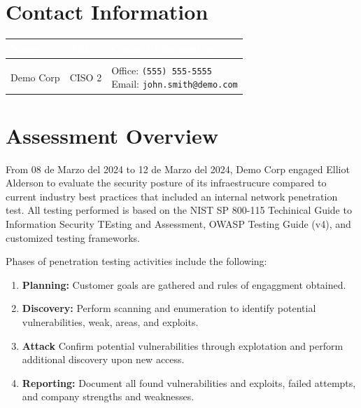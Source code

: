 \documentclass[a4paper]{article} %
\makeatletter
\newcommand{\clientName}{Demo Corp}
\newcommand{\clientTitle}{CISO}
\newcommand{\clientEmail}{john.smith@demo.com}
\newcommand{\clientPhone}{(555) 555-5555}
\newcommand{\theAuthor}{Elliot Alderson}
\newcommand{\theAuthorTitle}{Lead Penetration Tester}
\newcommand{\theAuthorEmail}{elliot.alderson@proton.me}
\newcommand{\startDatePentest}{08 de Marzo del 2024}
\newcommand{\finalDatePentest}{12 de Marzo del 2024}
\makeatother
\begin{document}
    \section{Contact Information} %
    \begin{table}[htbp]
        \begin{tabularx}{\textwidth}{|X|X|p{6cm}|}
            \hline
            \rowcolor{gray}
            \textbf{\textcolor{white}{Name}} & \textbf{\textcolor{white}{Title}} & \textbf{\textcolor{white}{Contact Information}} \\
            \hline
            \rowcolor{lightgray}
            \multicolumn{3}{|l|}{\textbf{\clientName}} \\
            \hline
            {\clientName} & {\clientTitle} 2 & \parbox[t]{6cm}{Office: \texttt{{\clientPhone}} \\ Email: \texttt{{\clientEmail}}} \\
            \hline
            \multicolumn{3}{|l|}{\textbf{\theAuthor}} \\
            \hline
            {\theAuthor} & {\theAuthorTitle} & Email: \texttt{\theAuthorEmail} \\
            \hline
        \end{tabularx}
    \end{table}
    \clearpage

    \section{Assessment Overview} %
    From {\startDatePentest} to {\finalDatePentest}, {\clientName} engaged {\theAuthor} to evaluate the security posture of its infraestrucure compared to current industry best practices that included an internal network penetration test. All testing performed is based on the NIST SP 800-115 Techinical Guide to Information Security TEsting and Assessment, OWASP Testing Guide (v4), and customized testing frameworks.

    Phases of penetration testing activities include the following:

    \begin{enumerate}[label=\textit{\arabic*.}]
        \item \textbf{Planning:} Customer goals are gathered and rules of engaggment obtained.
        \item \textbf{Discovery:} Perform scanning and enumeration to identify potential vulnerabilities, weak, areas, and exploits.
        \item \textbf{Attack} Confirm potential vulnerabilities through explotation and perform additional discovery upon new access.
        \item \textbf{Reporting:} Document all found vulnerabilities and exploits, failed attempts, and company strengths and weaknesses.
    \end{enumerate}
\end{document}

